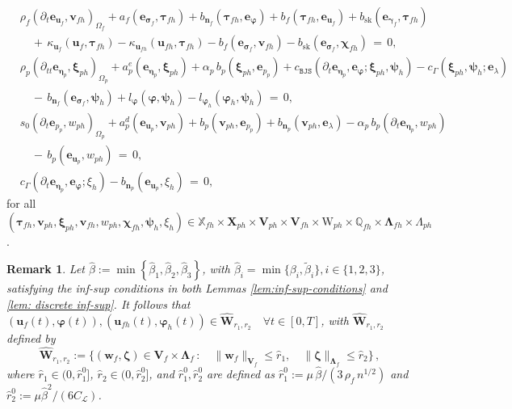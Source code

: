 \documentclass[11pt]{article}
\numberwithin{equation}{section}
\newcommand{\bgamma}{{\boldsymbol\gamma}}
\newcommand{\bLambda}{{\boldsymbol\Lambda}}
\newcommand{\bbeta}{{\boldsymbol\eta}}
\newcommand{\bsi}{{\boldsymbol\sigma}}
\newcommand{\bvarphi}{{\boldsymbol\varphi}}
\newcommand{\bpsi}{{\boldsymbol\psi}}
\newcommand{\btau}{{\boldsymbol\tau}}
\newcommand{\bzeta}{{\boldsymbol\zeta}}
\newcommand{\bchi}{{\boldsymbol\chi}}
\newcommand{\bxi}{{\boldsymbol\xi}}
\newcommand{\bv}{{\mathbf{v}}}
\newcommand{\bw}{{\mathbf{w}}}
\newcommand{\bu}{\mathbf{u}}
\newcommand{\bn}{{\mathbf{n}}}
\newcommand{\be}{{\mathbf{e}}}
\newcommand{\0}{{\mathbf{0}}}
\def\bX{\mathbf{X}}
\def\bV{\mathbf{V}}
\def\bW{\mathbf{W}}
\newcommand\bbQ{\mathbb{Q}}
\newcommand\bbX{\mathbb{X}}
\newcommand{\cL}{\mathcal{L}}
\def\W{\mathrm{W}}
\def\BJS{\mathtt{BJS}}
\def\sk{\mathrm{sk}}
\def\wt{\widetilde}
\def\wh{\widehat}
\newtheorem{rem}{Remark}[section]
\numberwithin{equation}{section}
\begin{document}
\begin{align}
&\rho_f (\partial_t\be_{\bu_f},\bv_{fh})_{\Omega_f}+ a_f(\be_{\bsi_f},\btau_{fh})+b_{\bn_f}(\btau_{fh},\be_{\bvarphi}) + b_f(\btau_{fh},\be_{\bu_f}) + b_\sk(\be_{\bgamma_f},\btau_{fh}) \nonumber\\ 
&\quad +\, \kappa_{\bu_{f}}(\bu_{f}, \btau_{fh}) - \kappa_{\bu_{fh}}(\bu_{fh}, \btau_{fh})-b_f(\be_{\bsi_f},\bv_{fh}) - b_\sk(\be_{\bsi_f},\bchi_{fh})  \, = \,0,\nonumber\\ 
& \rho_p(\partial_{tt}\be_{\bbeta_p},\bxi_{ph})_{\Omega_p} + a^e_p(\be_{\bbeta_p},\bxi_{ph})+ \alpha_p\,b_p(\bxi_{ph},\be_{p_p}) +c_{\BJS}(\partial_t\be_{\bbeta_p}, \be_{\bvarphi};\bxi_{ph}, \bpsi_{h})- c_{\Gamma}(\bxi_{ph},\bpsi_{h};\be_{\lambda}) \nonumber\\ 
&\quad -\, b_{\bn_f}(\be_{\bsi_f},\bpsi_{h})+l_{\bvarphi}(\bvarphi,\bpsi_{h}) - l_{\bvarphi_{h}}(\bvarphi_{h},\bpsi_{h})\, = \,0,\nonumber\\ 
& s_0 (\partial_t\be_{p_p},w_{ph})_{\Omega_p} +a^d_p(\be_{\bu_p},\bv_{ph}) +b_p(\bv_{ph},\be_{p_p})+b_{\bn_p}(\bv_{ph},\be_{\lambda})  - \alpha_p\,b_p(\partial_t\be_{\bbeta_p},w_{ph}) \nonumber\\ 
&\quad -\, b_p(\be_{\bu_p},w_{ph}) \,=\, 0,\nonumber\\ 
&c_{\Gamma}(\partial_t\be_{\bbeta_p},\be_{\bvarphi};\xi_{h})-b_{\bn_p}(\be_{\bu_p},\xi_{h})\, = \,0,  \label{eq:NS-Biot-errorformulation-1}
\end{align}
for all $(\btau_{fh}, \bv_{ph}, \bxi_{ph}, \bv_{fh}, w_{ph}, \bchi_{fh}, \bpsi_{h}, \xi_{h})\in \bbX_{fh}\times \bX_{ph}\times \bV_{ph}\times \bV_{fh}\times \W_{ph}\times \bbQ_{fh}\times \bLambda_{fh}\times \Lambda_{ph}$.

\begin{rem}
	
Let $\wh{\beta}:= \min\left\{ \wh{\beta}_1, \wh{\beta}_2, \wh{\beta}_3\right\}$, with $\wh{\beta}_i = \min\big\{\beta_i, \wt{\beta}_i\big\}, i\in \{1,2,3\}$, satisfying the inf-sup conditions in both Lemmas \ref{lem:inf-sup-conditions} and \ref{lem: discrete inf-sup}. 
It follows that $(\bu_f(t),\bvarphi(t)), (\bu_{fh}(t),\bvarphi_{h}(t)) \in \wh{\bW}_{r_{1},r_{2}} \quad \forall t\in [0,T]$, with $\wh{\bW}_{r_{1},r_{2}}$ defined by
\begin{equation}\label{eq:wh-Wr-definition}
\wh{\bW}_{r_{1},r_{2}} := \Big\{ (\bw_{f},\bzeta)\in \bV_{f}\times \bLambda_{f} \,:\quad \| \bw_{f}\|_{\bV_f} \leq \wh{r}_{1},\quad \|\bzeta\|_{\bLambda_f} \leq\wh{r}_{2} \Big\}\,,
\end{equation}
where $\wh{r}_1 \in (0,\wh{r}_{1}^0]$, $\wh{r}_{2}\in (0,\wh{r}_{2}^0]$, and $\wh{r}_1^0, \wh{r}_{2}^0$ are defined as 
$\wh{r}_{1}^0 := \mu\,\wh{\beta}/(3\,\rho_f\,n^{1/2})$ and  
$\wh{r}_{2}^0 := \mu \wh{\beta}^2/(6C_{\cL})$.
\end{rem}
\end{document}
